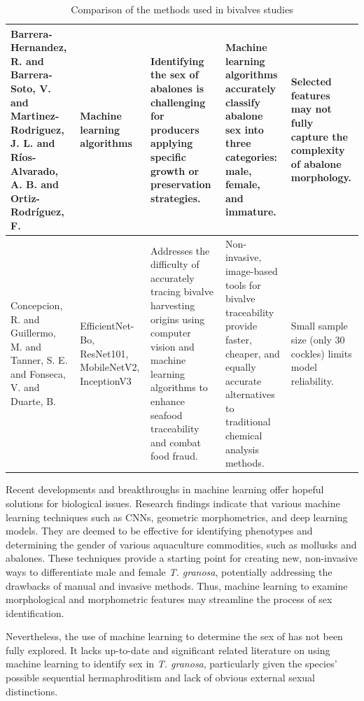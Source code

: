 \begin{table}[]
\begin{adjustbox}{scale=0.55,center}
\begin{tabular}{|p{5cm}|p{5cm}|p{8cm}|p{8cm}|p{8cm}|}
		Barrera-Hernandez, R. and Barrera-Soto, V. and Martinez-Rodriguez, J. L. and Ríos-Alvarado, A. B. and Ortiz-Rodríguez, F. &
		Machine learning algorithms &
		Identifying the sex of abalones is challenging for producers applying specific growth or preservation strategies. &
		Machine learning algorithms accurately classify abalone sex into three categories: male, female, and immature. &
		Selected features may not fully capture the complexity of abalone morphology. \\ \hline
		
		Concepcion, R. and Guillermo, M. and Tanner, S. E. and Fonseca, V. and Duarte, B. &
		EfficientNet-Bo, ResNet101, MobileNetV2, InceptionV3 &
		Addresses the difficulty of accurately tracing bivalve harvesting origins using computer vision and machine learning algorithms to enhance seafood traceability and combat food fraud. &
		Non-invasive, image-based tools for bivalve traceability provide faster, cheaper, and equally accurate alternatives to traditional chemical analysis methods. &
		Small sample size (only 30 cockles) limits model reliability. \\ \hline
		
	\end{tabular}
	
	\end{adjustbox}
	\caption{Comparison of the methods used in bivalves studies}
	\label{table:1}
\end{table}

\newpage

Recent developments and breakthroughs in machine learning offer hopeful solutions for biological issues. Research findings indicate that various machine learning techniques such as CNNs, geometric morphometrics, and deep learning models. They are deemed to be effective for identifying phenotypes and determining the gender of various aquaculture commodities, such as mollusks and abalones. These techniques provide a starting point for creating new, non-invasive ways to differentiate male and female \textit{T. granosa}, potentially addressing the drawbacks of manual and invasive methods. Thus,  machine learning to examine morphological and morphometric features may streamline the process of sex identification.

Nevertheless, the use of machine learning to determine the sex of \Tgranosa has not been fully explored. It lacks up-to-date and significant related literature on using machine learning to identify sex in \textit{T. granosa}, particularly given the species’ possible sequential hermaphroditism and lack of obvious external sexual distinctions.










